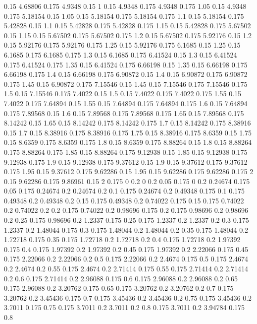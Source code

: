 0.15 4.68806
0.175 4.9348
0.15 1
0.15 4.9348
0.175 4.9348
0.175 1.05
0.15 4.9348
0.175 5.18154
0.15 1.05
0.15 5.18154
0.175 5.18154
0.175 1.1
0.15 5.18154
0.175 5.42828
0.15 1.1
0.15 5.42828
0.175 5.42828
0.175 1.15
0.15 5.42828
0.175 5.67502
0.15 1.15
0.15 5.67502
0.175 5.67502
0.175 1.2
0.15 5.67502
0.175 5.92176
0.15 1.2
0.15 5.92176
0.175 5.92176
0.175 1.25
0.15 5.92176
0.175 6.1685
0.15 1.25
0.15 6.1685
0.175 6.1685
0.175 1.3
0.15 6.1685
0.175 6.41524
0.15 1.3
0.15 6.41524
0.175 6.41524
0.175 1.35
0.15 6.41524
0.175 6.66198
0.15 1.35
0.15 6.66198
0.175 6.66198
0.175 1.4
0.15 6.66198
0.175 6.90872
0.15 1.4
0.15 6.90872
0.175 6.90872
0.175 1.45
0.15 6.90872
0.175 7.15546
0.15 1.45
0.15 7.15546
0.175 7.15546
0.175 1.5
0.15 7.15546
0.175 7.4022
0.15 1.5
0.15 7.4022
0.175 7.4022
0.175 1.55
0.15 7.4022
0.175 7.64894
0.15 1.55
0.15 7.64894
0.175 7.64894
0.175 1.6
0.15 7.64894
0.175 7.89568
0.15 1.6
0.15 7.89568
0.175 7.89568
0.175 1.65
0.15 7.89568
0.175 8.14242
0.15 1.65
0.15 8.14242
0.175 8.14242
0.175 1.7
0.15 8.14242
0.175 8.38916
0.15 1.7
0.15 8.38916
0.175 8.38916
0.175 1.75
0.15 8.38916
0.175 8.6359
0.15 1.75
0.15 8.6359
0.175 8.6359
0.175 1.8
0.15 8.6359
0.175 8.88264
0.15 1.8
0.15 8.88264
0.175 8.88264
0.175 1.85
0.15 8.88264
0.175 9.12938
0.15 1.85
0.15 9.12938
0.175 9.12938
0.175 1.9
0.15 9.12938
0.175 9.37612
0.15 1.9
0.15 9.37612
0.175 9.37612
0.175 1.95
0.15 9.37612
0.175 9.62286
0.15 1.95
0.15 9.62286
0.175 9.62286
0.175 2
0.15 9.62286
0.175 9.86961
0.15 2
0.175 0
0.2 0
0.2 0.05
0.175 0
0.2 0.24674
0.175 0.05
0.175 0.24674
0.2 0.24674
0.2 0.1
0.175 0.24674
0.2 0.49348
0.175 0.1
0.175 0.49348
0.2 0.49348
0.2 0.15
0.175 0.49348
0.2 0.74022
0.175 0.15
0.175 0.74022
0.2 0.74022
0.2 0.2
0.175 0.74022
0.2 0.98696
0.175 0.2
0.175 0.98696
0.2 0.98696
0.2 0.25
0.175 0.98696
0.2 1.2337
0.175 0.25
0.175 1.2337
0.2 1.2337
0.2 0.3
0.175 1.2337
0.2 1.48044
0.175 0.3
0.175 1.48044
0.2 1.48044
0.2 0.35
0.175 1.48044
0.2 1.72718
0.175 0.35
0.175 1.72718
0.2 1.72718
0.2 0.4
0.175 1.72718
0.2 1.97392
0.175 0.4
0.175 1.97392
0.2 1.97392
0.2 0.45
0.175 1.97392
0.2 2.22066
0.175 0.45
0.175 2.22066
0.2 2.22066
0.2 0.5
0.175 2.22066
0.2 2.4674
0.175 0.5
0.175 2.4674
0.2 2.4674
0.2 0.55
0.175 2.4674
0.2 2.71414
0.175 0.55
0.175 2.71414
0.2 2.71414
0.2 0.6
0.175 2.71414
0.2 2.96088
0.175 0.6
0.175 2.96088
0.2 2.96088
0.2 0.65
0.175 2.96088
0.2 3.20762
0.175 0.65
0.175 3.20762
0.2 3.20762
0.2 0.7
0.175 3.20762
0.2 3.45436
0.175 0.7
0.175 3.45436
0.2 3.45436
0.2 0.75
0.175 3.45436
0.2 3.7011
0.175 0.75
0.175 3.7011
0.2 3.7011
0.2 0.8
0.175 3.7011
0.2 3.94784
0.175 0.8
